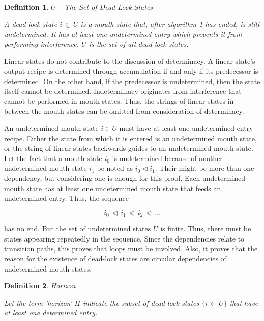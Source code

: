 \documentclass[12pt,a4paper]{scrartcl}
\newtheorem{definition}{Definition}
\begin{document}
\begin{definition} $U$ -- The Set of Dead-Lock States

A dead-lock state $i\,\in\,U$ is a mouth state that, after algorithm 1 has
ended, is still undetermined. It has at least one undetermined entry which
prevents it from performing interference. $U$ is the set of all dead-lock
states.

\end{definition}

Linear states do not contribute to the discussion of determinacy. A linear state's
output recipe is determined through accumulation if and only if its predecessor
is determined. On the other hand, if the predecessor is undetermined, then the 
state itself cannot be determined. Indeterminacy originates from interference 
that cannot be performed in mouth states. Thus, the strings of linear states
in between the mouth states can be omitted from consideration of determinacy.

An undetermined mouth state $i \in U$ must have at least one undetermined entry
recipe. Either the state from which it is entered is an undetermined mouth state, 
or the string of linear states backwards guides to an undetermined mouth state. 
Let the fact that a mouth state $i_0$ is undetermined because of another
undetermined mouth state $i_1$ be noted as $i_0 \vartriangleleft i_1$. Their might
be more than one dependency, but considering one is enough for this proof. Each
undetermined mouth state has at least one undetermined mouth state that feeds
an undetermined entry. Thus, the sequence 

\begin{equation}
    i_0\,\vartriangleleft\,i_1\,\vartriangleleft\,i_2\,\vartriangleleft\,\ldots
\end{equation}

has no end. But the set of undetermined states $U$ is finite. Thus, there must
be states appearing repeatedly in the sequence. Since the dependencies relate to
transition paths, this proves that loops must be involved. Also, it proves that
the reason for the existence of dead-lock states are circular dependencies of
undetermined mouth states.

\begin{definition}
Horizon

Let the term 'horizon' $H$ indicate the subset of dead-lock states $\{ i\,\in\,U \}$
that have at least one determined entry.
\end{definition}
\end{document}
